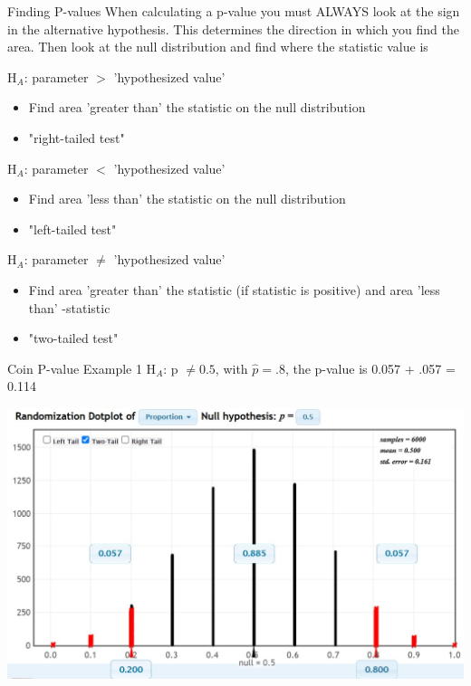 \documentclass{beamer}
\begin{document}
\begin{frame}{Finding P-values}
When calculating a p-value you must ALWAYS look at the sign in the alternative hypothesis. This determines the direction in which you find the area. Then look at the null distribution and find where the statistic value is\vspace{4mm}

H$_A$: parameter $>$ 'hypothesized value'
\begin{itemize}
    \item Find area 'greater than' the statistic on the null distribution
    \item "right-tailed test"
\end{itemize} \vspace{4mm}

H$_A$: parameter $<$ 'hypothesized value'
\begin{itemize}
    \item Find area 'less than' the statistic on the null distribution
    \item "left-tailed test"
\end{itemize} \vspace{4mm}

H$_A$: parameter $\neq$ 'hypothesized value'
\begin{itemize}
    \item Find area 'greater than' the statistic (if statistic is positive) and area 'less than' -statistic
    \item "two-tailed test"
\end{itemize} \vspace{4mm}
\end{frame}

\begin{frame}{Coin P-value Example 1}
H$_A$: p $\neq 0.5$, with $\widehat{p} = .8$, the p-value is 0.057 + .057 = 0.114
\begin{center}
    \includegraphics[scale=.55]{img/coin_pvalue.jpg}
\end{center}
\end{frame}
\end{document}
